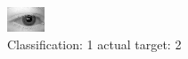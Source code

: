 \begin{figure}[h!]
\begin{center}
\includegraphics[width=0.60\columnwidth]{figures/ID354_class_1_target_2.png}
\end{center}
\caption{ Classification: 1 actual target: 2}
\label{fig:ID354_class_1_target_2}
\end{figure}

